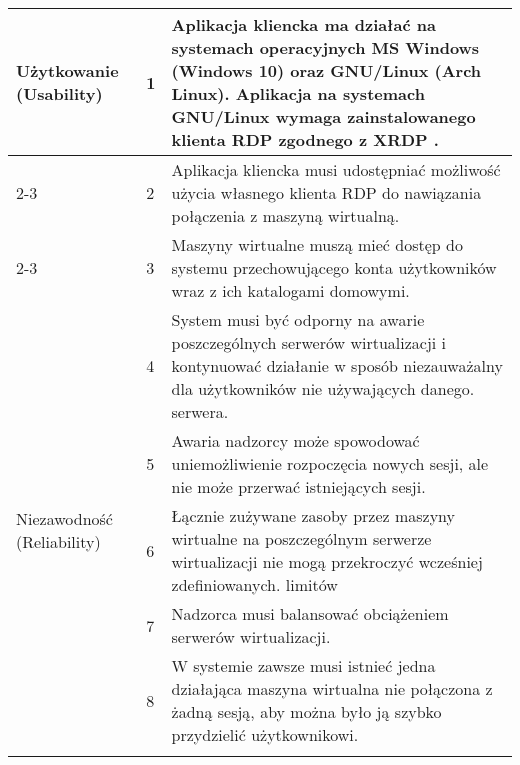 \documentclass[../wstep.tex]{subfiles}
\begin{document}
\begin{longtable}{|p{}|p{}|p{}|}
    \multirow[t]{11}{=}{Użytkowanie (Usability)}    & 1            & Aplikacja kliencka ma działać na systemach operacyjnych MS Windows (Windows 10) oraz GNU/Linux (Arch Linux). Aplikacja na systemach GNU/Linux wymaga zainstalowanego klienta RDP zgodnego z XRDP \parencite{xrdp-clients}. \\ \cline{2-3}
                                                    & 2            & Aplikacja kliencka musi udostępniać możliwość użycia własnego klienta RDP do nawiązania połączenia z maszyną wirtualną.                                                                                                     \\ \cline{2-3}
                                                    & 3            & Maszyny wirtualne muszą mieć dostęp do systemu przechowującego konta użytkowników wraz z ich katalogami domowymi.                                                                                                           \\ \hline
    \multirow[t]{7}{=}{Niezawodność (Reliability)}  & 4            & System musi być odporny na awarie poszczególnych serwerów wirtualizacji i kontynuować działanie w sposób niezauważalny dla użytkowników nie używających danego. serwera.                                                    \\ \cline{2-3}
                                                    & 5            & Awaria nadzorcy może spowodować uniemożliwienie rozpoczęcia nowych sesji, ale nie może przerwać istniejących sesji.                                                                                                         \\ \hline
    \multirow[t]{11}{=}{Wydajność (Performance)}    & 6            & Łącznie zużywane zasoby przez maszyny wirtualne na poszczególnym serwerze wirtualizacji nie mogą przekroczyć wcześniej zdefiniowanych. limitów                                                                              \\ \cline{2-3}
                                                    & 7            & Nadzorca musi balansować obciążeniem serwerów wirtualizacji.                                                                                                                                                                 \\ \cline{2-3}
                                                    & 8            & W systemie zawsze musi istnieć jedna działająca maszyna wirtualna nie połączona z żadną sesją, aby można było ją szybko przydzielić użytkownikowi.                                                                         \\ \cline{2-3}

\end{longtable}
\end{document}
